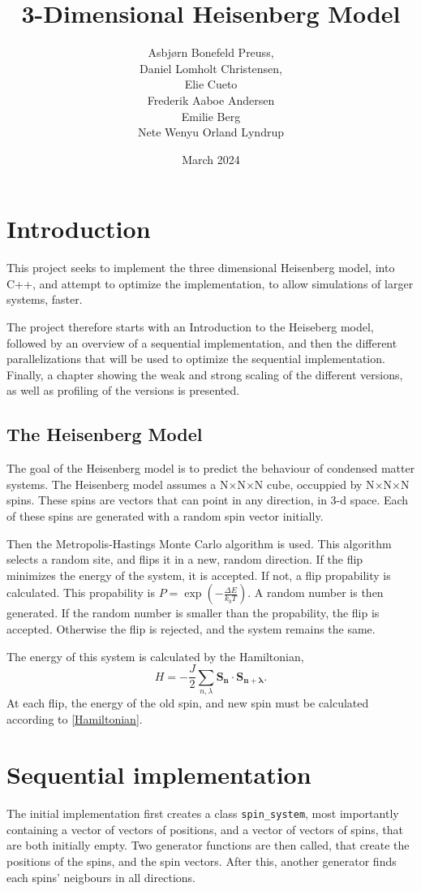 \documentclass{article}
\title{3-Dimensional Heisenberg Model}
\author{Asbjørn Bonefeld Preuss,\\ Daniel Lomholt Christensen,\\ Elie Cueto \\ Frederik Aaboe Andersen \\ Emilie Berg \\ Nete Wenyu Orland Lyndrup}
\date{March 2024}
\begin{document}
\maketitle

\section{Introduction}
This project seeks to implement the three dimensional Heisenberg model, into C++, and attempt to optimize the implementation, to allow simulations of larger systems, faster.

The project therefore starts with an Introduction to the Heiseberg model, followed by an overview of a sequential implementation, and then the different parallelizations that will be used to optimize the sequential implementation. Finally, a chapter showing the weak and strong scaling of the different versions, as well as profiling of the versions is presented.

\subsection{The Heisenberg Model}
The goal of the Heisenberg model is to predict the behaviour of condensed matter systems.
The Heisenberg model assumes a N$\times$N$\times$N cube, occuppied by N$\times$N$\times$N spins. These spins are vectors that can point in any direction, in 3-d space. Each of these spins are generated with a random spin vector initially. 

Then the Metropolis-Hastings Monte Carlo algorithm is used. This algorithm selects a random site, and flips it in a new, random direction. If the flip minimizes the energy of the system, it is accepted. If not, a flip propability is calculated. This propability is $P=\exp\left(-\frac{\Delta E}{k_bT}\right)$. %
A random number is then generated. If the random number is smaller than the propability, the flip is accepted. Otherwise the flip is rejected, and the system remains the same.

The energy of this system is calculated by the Hamiltonian\cite{Heisenberg},
\begin{equation}
    H = - \frac{J}{2}\sum_{n, \lambda}\mathbf{S_n}\cdot\mathbf{S_{n + \lambda}}.
    \label{Hamiltonian}
\end{equation}
At each flip, the energy of the old spin, and new spin must be calculated according to \ref{Hamiltonian}. 

\section{Sequential implementation}
The initial implementation first creates a class \verb|spin_system|, most importantly containing a vector of vectors of positions, and a vector of vectors of spins, that are both initially empty. Two generator functions are then called, that create the positions of the spins, and the spin vectors. After this, another generator finds each spins' neigbours in all directions.
\end{document}
